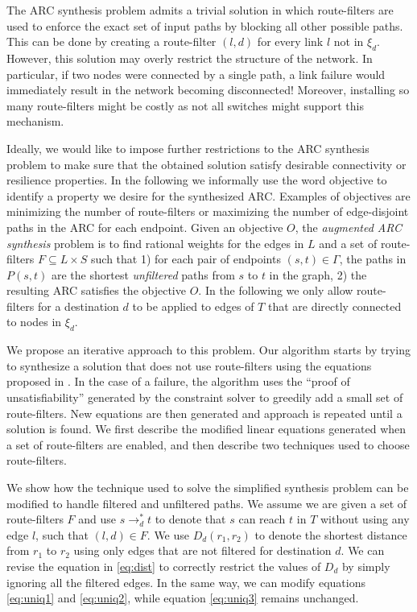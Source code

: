 The ARC synthesis problem admits a trivial solution in which 
route-filters are used to enforce the exact set of input paths by blocking all other possible paths.
This can be done by creating a 
route-filter $(l,d)$ for every link $l$ not in $\xi_d$. 
However, this solution may overly restrict the structure of the network.
In particular, if two nodes were connected by a single path,
a link failure would immediately result in the network becoming disconnected!
Moreover, installing so many route-filters might be costly as not all switches might
support this mechanism.

Ideally, we would like to impose further restrictions to the ARC
synthesis problem to make sure that the obtained solution
satisfy desirable connectivity or resilience properties.
In the following we informally use the word objective 
to identify a property we desire for the synthesized ARC.
Examples of objectives are minimizing the number of route-filters
or maximizing the number of edge-disjoint paths in the ARC
for each endpoint. 
Given an objective $O$, the \emph{augmented ARC synthesis} problem
is to find rational weights for the edges in $L$
and a set of route-filters $F\subseteq L\times S$
 such that 
1) for each pair of endpoints $(s,t) \in \Gamma$, 
the paths in $P(s,t)$ are the shortest \emph{unfiltered} paths from $s$ to $t$ 
in the graph,
2) the resulting ARC satisfies the objective $O$. 
In the following we only allow route-filters for a destination $d$ to be applied to edges of $T$ that are directly connected to 
nodes in $\xi_d$. 

We propose an iterative approach to this problem. 
Our algorithm starts by trying to synthesize a solution
that does not use route-filters using the equations proposed in . 
In the case of a failure, the algorithm uses the ``proof of unsatisfiability'' generated by the constraint solver 
to greedily add a small set of route-filters. New equations are then generated and approach is repeated until a solution is found.
We first describe the 
modified linear equations generated when a set of
route-filters are enabled, and then describe two
techniques used to choose route-filters. 

We show how the technique used to solve the simplified synthesis
problem can be modified to handle filtered and unfiltered paths.
We assume we are given a set of route-filters $F$ and 
use $s\rightarrow_d^* t$ to denote that $s$ can reach $t$
in $T$ without using any edge $l$, such that $(l,d)\in F$.
We use $D_d(r_1, r_2)$ to denote the shortest distance from $r_1$ to $r_2$
using only edges that are not filtered for destination $d$.
We can revise the equation in \eqref{eq:dist} to correctly restrict the values of $D_d$
by simply ignoring all the filtered edges. 
In the same way, we can modify equations  \eqref{eq:uniq1} and \eqref{eq:uniq2}, while
equation \eqref{eq:uniq3} remains unchanged.

